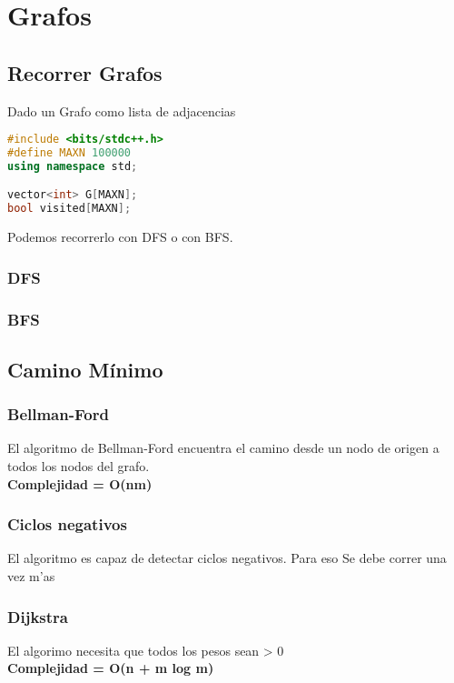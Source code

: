 \newpage
\section{Grafos}

\subsection{Recorrer Grafos}
Dado un Grafo como lista de adjacencias

\begin{lstlisting}[language=C++]
#include <bits/stdc++.h>
#define MAXN 100000
using namespace std;

vector<int> G[MAXN];
bool visited[MAXN];
\end{lstlisting}

Podemos recorrerlo con DFS o con BFS.

\subsubsection{DFS}


\subsubsection{BFS}

\newpage

\subsection{Camino Mínimo}

\subsubsection{Bellman-Ford}
El algoritmo de Bellman-Ford encuentra el camino desde un nodo de origen a todos los nodos del grafo. \\
\textbf{Complejidad = O(nm)}


\subsubsection{Ciclos negativos}
El algoritmo es capaz de detectar ciclos negativos. Para eso Se debe correr una vez m'as
\newpage

\subsubsection{Dijkstra}
El algorimo necesita que todos los pesos sean > 0 \\
\textbf{Complejidad = O(n + m log m)}


\newpage
